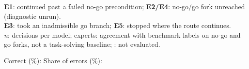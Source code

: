 \par\vspace{3pt}
\begin{minipage}{\linewidth}
\fontsize{6.7}{8}\selectfont\raggedright
\textbf{E1}: continued past a failed no-go precondition; \textbf{E2/E4}: no-go/go fork unreached (diagnostic unrun).\\
\textbf{E3}: took an inadmissible go branch; \textbf{E5}: stopped where the route continues.\\
\textit{n}: decisions per model; experts: agreement with benchmark labels on \bdExpertNogoN{} no-go and \bdExpertGoN{} go forks, not a task-solving baseline; \textemdash: not evaluated.
\par\vspace{2pt}
\setlength{\fboxsep}{1.5pt} Correct (\%): \colorbox[HTML]{3182BD}{\makebox[13pt]{\textcolor{black}{0}}}\colorbox[HTML]{F7F6F6}{\makebox[13pt]{\textcolor{black}{50}}}\colorbox[HTML]{A50F15}{\makebox[13pt]{\textcolor{white}{100}}}\hfill Share of errors (\%): \colorbox[HTML]{3182BD}{\makebox[13pt]{\textcolor{black}{0}}}\colorbox[HTML]{F7F6F6}{\makebox[13pt]{\textcolor{black}{50}}}\colorbox[HTML]{A50F15}{\makebox[13pt]{\textcolor{white}{100}}}
\end{minipage}
\endgroup
